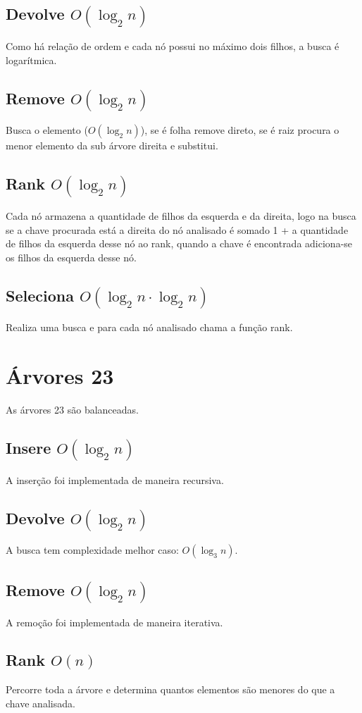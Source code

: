 \documentclass[14pt]{article}
\begin{document}
{\subsection{Devolve $O(\log_{2}n)$} 
Como há relação de ordem e cada nó possui no máximo dois filhos, a busca é logarítmica.
\subsection{Remove $O(\log_{2}n)$}
Busca o elemento ($O(\log_{2}n)$), se é folha remove direto, se é raiz procura o menor elemento da 
sub árvore direita e substitui.
\subsection{Rank $O(\log_{2}n)$}
Cada nó armazena a quantidade de filhos da esquerda e da direita, logo na busca se a chave procurada
está a direita do nó analisado é somado 1 + a quantidade de filhos da esquerda desse nó ao rank, quando a chave 
é encontrada adiciona-se os filhos da esquerda desse nó.
\subsection{Seleciona $O(\log_{2}n \cdot \log_{2}n )$}
Realiza uma busca e para cada nó analisado chama a função rank.
\\

\section{Árvores 23}
As árvores 23 são balanceadas.

\subsection{Insere $O(\log_{2}n)$} 
A inserção foi implementada de maneira recursiva.
\subsection{Devolve $O(\log_{2}n)$} 
A busca tem complexidade melhor caso: $O(\log_{3}n)$.
\subsection{Remove $O(\log_{2}n)$}
A remoção foi implementada de maneira iterativa.
\subsection{Rank $O(n)$}
Percorre toda a árvore e determina quantos elementos são menores do que a chave analisada.
}
\end{document}
